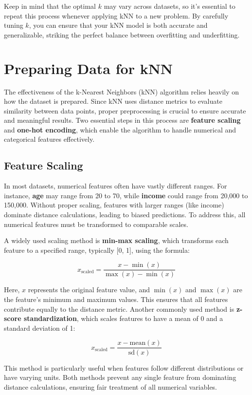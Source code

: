 \documentclass[
]{book}
\theoremstyle{definition}
\theoremstyle{definition}
\theoremstyle{definition}
\theoremstyle{definition}
\theoremstyle{remark}
\begin{document}
Keep in mind that the optimal \(k\) may vary across datasets, so it's essential to repeat this process whenever applying kNN to a new problem. By carefully tuning \(k\), you can ensure that your kNN model is both accurate and generalizable, striking the perfect balance between overfitting and underfitting.

\section{Preparing Data for kNN}\label{preparing-data-for-knn}

The effectiveness of the k-Nearest Neighbors (kNN) algorithm relies heavily on how the dataset is prepared. Since kNN uses distance metrics to evaluate similarity between data points, proper preprocessing is crucial to ensure accurate and meaningful results. Two essential steps in this process are \textbf{feature scaling} and \textbf{one-hot encoding}, which enable the algorithm to handle numerical and categorical features effectively.

\subsection{Feature Scaling}\label{feature-scaling-1}

In most datasets, numerical features often have vastly different ranges. For instance, \textbf{age} may range from 20 to 70, while \textbf{income} could range from 20,000 to 150,000. Without proper scaling, features with larger ranges (like income) dominate distance calculations, leading to biased predictions. To address this, all numerical features must be transformed to comparable scales.

A widely used scaling method is \textbf{min-max scaling}, which transforms each feature to a specified range, typically {[}0, 1{]}, using the formula:

\[
x_{\text{scaled}} = \frac{x - \min(x)}{\max(x) - \min(x)}
\]

Here, \(x\) represents the original feature value, and \(\min(x)\) and \(\max(x)\) are the feature's minimum and maximum values. This ensures that all features contribute equally to the distance metric. Another commonly used method is \textbf{z-score standardization}, which scales features to have a mean of 0 and a standard deviation of 1:

\[
x_{\text{scaled}} = \frac{x - \text{mean}(x)}{\text{sd}(x)}
\]

This method is particularly useful when features follow different distributions or have varying units. Both methods prevent any single feature from dominating distance calculations, ensuring fair treatment of all numerical variables.
\end{document}
